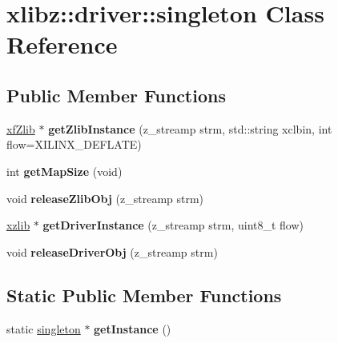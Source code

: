 \hypertarget{classxlibz_1_1driver_1_1singleton}{\section{xlibz\-:\-:driver\-:\-:singleton Class Reference}
\label{classxlibz_1_1driver_1_1singleton}
}
\subsection*{Public Member Functions}
\begin{DoxyCompactItemize}
\item 
\hypertarget{classxlibz_1_1driver_1_1singleton_a7054e3c068b0aef77da6ae007f116ea8}{\hyperlink{classxf_1_1compression_1_1xfZlib}{xf\-Zlib} $\ast$ {\bfseries get\-Zlib\-Instance} (z\-\_\-streamp strm, std\-::string xclbin, int flow=X\-I\-L\-I\-N\-X\-\_\-\-D\-E\-F\-L\-A\-T\-E)}\label{classxlibz_1_1driver_1_1singleton_a7054e3c068b0aef77da6ae007f116ea8}

\item 
\hypertarget{classxlibz_1_1driver_1_1singleton_abdd7bf1d21c81b7b4d644b9517c29eec}{int {\bfseries get\-Map\-Size} (void)}\label{classxlibz_1_1driver_1_1singleton_abdd7bf1d21c81b7b4d644b9517c29eec}

\item 
\hypertarget{classxlibz_1_1driver_1_1singleton_ae15aa369b44abd9d3b11b04b195de7b1}{void {\bfseries release\-Zlib\-Obj} (z\-\_\-streamp strm)}\label{classxlibz_1_1driver_1_1singleton_ae15aa369b44abd9d3b11b04b195de7b1}

\item 
\hypertarget{classxlibz_1_1driver_1_1singleton_a2332e36f4f21449855f98a20e904a11d}{\hyperlink{classxlibz_1_1driver_1_1xzlib}{xzlib} $\ast$ {\bfseries get\-Driver\-Instance} (z\-\_\-streamp strm, uint8\-\_\-t flow)}\label{classxlibz_1_1driver_1_1singleton_a2332e36f4f21449855f98a20e904a11d}

\item 
\hypertarget{classxlibz_1_1driver_1_1singleton_af441ad6e72a663b47f4bc48ab2463515}{void {\bfseries release\-Driver\-Obj} (z\-\_\-streamp strm)}\label{classxlibz_1_1driver_1_1singleton_af441ad6e72a663b47f4bc48ab2463515}

\end{DoxyCompactItemize}
\subsection*{Static Public Member Functions}
\begin{DoxyCompactItemize}
\item 
\hypertarget{classxlibz_1_1driver_1_1singleton_a97b6263597c4a8b4c3d9d91743810d51}{static \hyperlink{classxlibz_1_1driver_1_1singleton}{singleton} $\ast$ {\bfseries get\-Instance} ()}\label{classxlibz_1_1driver_1_1singleton_a97b6263597c4a8b4c3d9d91743810d51}

\end{DoxyCompactItemize}
